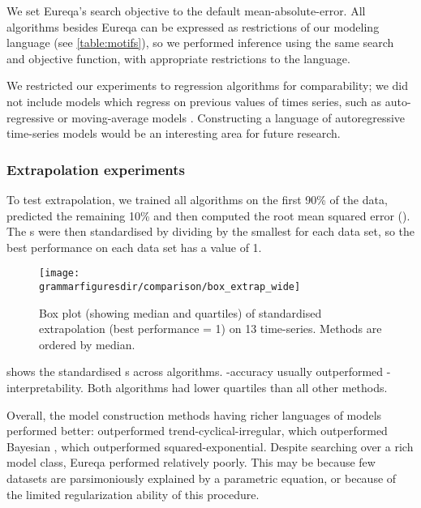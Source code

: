 We set Eureqa's search objective to the default mean-absolute-error.
All algorithms besides Eureqa can be expressed as restrictions of our modeling language (see \cref{table:motifs}), so we performed inference using the same search and objective function, with appropriate restrictions to the language.

We restricted our experiments to regression algorithms for comparability; we did not include models which regress on previous values of times series, such as auto-regressive or moving-average models \citep[e.g.][]{box2013time}.
Constructing a language of autoregressive time-series models would be an interesting area for future research.



\subsubsection{Extrapolation experiments}

To test extrapolation, we trained all algorithms on the first 90\% of the data, predicted the remaining 10\% and then computed the root mean squared error (\RMSE{}).
The \RMSE{}s were then standardised by dividing by the smallest \RMSE{} for each data set, so the best performance on each data set has a value of 1.

\begin{figure}[h!]
\texttt{[image: \\grammarfiguresdir/comparison/box\_extrap\_wide]}
\caption[Extrapolation error of all methods on 13 time-series datasets]
{Box plot (showing median and quartiles) of standardised extrapolation \RMSE{} (best performance = 1) on 13 time-series.
Methods are ordered by median.
}
\label{fig:box_extrap_dist}
\end{figure}


 shows the standardised \RMSE{}s across algorithms.
\procedurename{}-accuracy usually outperformed \procedurename{}-interpretability.
Both algorithms had lower quartiles than all other methods.

Overall, the model construction methods having richer languages of models performed better: \procedurename{} outperformed trend-cyclical-irregular, which outperformed Bayesian \MKL{}, which outperformed squared-exponential.
Despite searching over a rich model class, Eureqa performed relatively poorly.
This may be because few datasets are parsimoniously explained by a parametric equation, or because of the limited regularization ability of this procedure.

